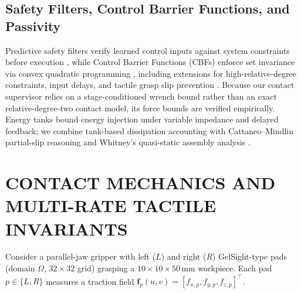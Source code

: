 \documentclass[letterpaper,10pt,conference]{IEEEtran}
\begin{document}
\subsection{Safety Filters, Control Barrier Functions, and Passivity}
Predictive safety filters verify learned control inputs against system constraints before execution \cite{wabersichfilter,hsufilter}, while Control Barrier Functions (CBFs) enforce set invariance via convex quadratic programming \cite{ames2019cbf}, including extensions for high-relative-degree constraints, input delays, and tactile grasp slip prevention \cite{xiaohocbf,singletarydelay,kim2025tactilecbf}. Because our contact supervisor relies on a stage-conditioned wrench bound rather than an exact relative-degree-two contact model, its force bounds are verified empirically. Energy tanks \cite{ferraguti2013tank} bound energy injection under variable impedance and delayed feedback; we combine tank-based dissipation accounting with Cattaneo--Mindlin partial-slip reasoning and Whitney's quasi-static assembly analysis \cite{whitney1982quasi}.


\section{CONTACT MECHANICS AND MULTI-RATE TACTILE INVARIANTS}

Consider a parallel-jaw gripper with left ($L$) and right ($R$) GelSight-type pads (domain $\Omega$, $32\times32$ grid) grasping a $10\times10\times50$\,mm workpiece. Each pad $p\in\{L,R\}$ measures a traction field $\mathbf{f}_p(u,v)=[f_{x,p},f_{y,p},f_{z,p}]^\top$.
\end{document}
